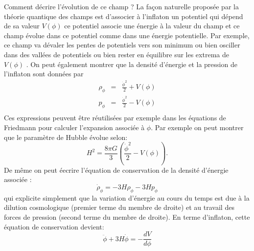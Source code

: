Comment décrire l'évolution de ce champ ? La façon naturelle proposée par la théorie quantique des champs est d'associer à l'inflaton un potentiel qui dépend de sa valeur $V(\phi)$  ce potentiel associe une énergie à la valeur du champ et ce champ évolue dans ce potentiel comme dans une énergie potentielle. Par exemple, ce champ va dévaler les pentes de potentiels vers son minimum ou bien osciller dans des vallées de potentiels ou bien rester en équilibre sur les extrema de $V(\phi)$ . On peut également montrer que la densité d'énergie et la pression de l'inflaton sont données par  
\begin{eqnarray}
\rho_\phi&=&\frac{\dot \phi^2}{2}+V(\phi)\\
p_\phi&=&\frac{\dot \phi^2}{2}-V(\phi)\\
\end{eqnarray}
Ces expressions peuvent être réutilisées par exemple dans les équations de Friedmann pour calculer l'expansion associée à $\phi$. Par exemple on peut montrer que le paramètre de Hubble évolue selon:
\begin{equation}
H^2=\frac{8\pi G}{3}\left(\frac{\dot \phi^2}{2}-V(\phi)\right).
\label{e:hubbleinf}
\end{equation}
De même on peut éecrire l'équation de conservation de la densité d'énergie associée :
\begin{equation}
\dot \rho_\phi= -3H\rho_\phi-3Hp_\phi
\end{equation}
qui explicite simplement que la variation d'énergie au cours du temps est due à la dilution cosmologique (premier terme du membre de droite) et au travail des forces de pression (second terme du membre de droite). En terme d'inflaton, cette équation de conservation devient:
\begin{equation}
\ddot \phi+ 3H \dot \phi = -\frac{d V}{d\phi}
\end{equation}


